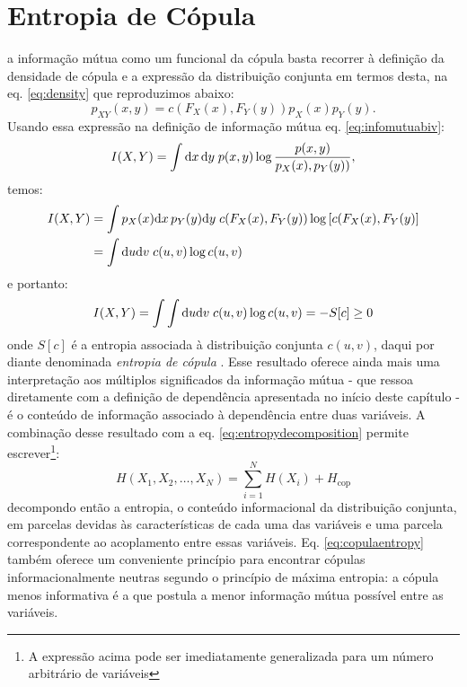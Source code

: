 \section{Entropia de Cópula}
\label{sec:copentropy}
 a informação mútua como um funcional da cópula basta recorrer à definição da densidade de cópula e a expressão da distribuição conjunta 
em termos desta, na eq. \eqref{eq:density} que reproduzimos abaixo:
\begin{equation*}
p_{XY}(x,y) = c(F_X(x), F_Y(y)) p_X(x) p_Y(y).
\end{equation*}
Usando essa expressão na definição de informação mútua eq. \eqref{eq:infomutuabiv}:
\begin{equation*}
 I(X,Y) = \int \mathrm{d} x\,\mathrm{d} y\; p(x, y) \log \frac{p(x, y)}{p_{X}(x),p_{Y}(y))},
\end{equation*}
temos:
\begin{align*}
 I(X,Y) &= \int p_X(x) \mathrm{d} x\, p_Y(y)\mathrm{d} y\; c(F_X(x), F_Y(y)) \log \left[c(F_X(x), F_Y(y)\right] \\&= \int \mathrm{d} u \mathrm{d} v\; c(u,v) \log c(u,v)
\end{align*}
e portanto:
\begin{equation}
\label{eq:copulaentropy}
I(X,Y) = \int \int \ud u \ud v \; c(u,v) \log c(u,v)  = - S[c] \ge 0
\end{equation}
onde $S[c]$ é a entropia associada à distribuição conjunta $c(u,v)$, daqui por diante denominada \textit{entropia de cópula} \cite{Ma2008,Jenison2004}.
Esse resultado oferece ainda mais uma interpretação aos múltiplos significados da informação mútua - que ressoa diretamente com a definição de dependência apresentada no início deste capítulo - é o conteúdo de informação associado à dependência entre duas variáveis. A combinação desse resultado com a eq. \eqref{eq:entropydecomposition} permite escrever\footnote{A expressão acima pode ser imediatamente generalizada para um número arbitrário de variáveis}:
\begin{equation}
\label{eq:entropydecomposition2}
H(X_1, X_2, \ldots, X_N) = \sum_{i=1}^{N} H(X_i) + H_{\mbox{cop}} 
\end{equation}
decompondo então a entropia, o conteúdo informacional da distribuição conjunta, em parcelas devidas às características de cada uma das variáveis e uma parcela correspondente ao acoplamento entre essas variáveis. Eq. \eqref{eq:copulaentropy} também oferece um conveniente princípio para encontrar cópulas informacionalmente neutras segundo o princípio de máxima entropia\cite{Jaynes2003}: a cópula menos informativa é a que postula a menor informação mútua possível entre as variáveis. 

